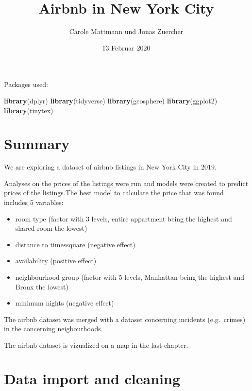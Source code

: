 \documentclass[]{article}
\title{Airbnb in New York City}
\author{Carole Mattmann und Jonas Zuercher}
\date{13 Februar 2020}
\newenvironment{Shaded}{\begin{snugshade}}{\end{snugshade}}
\newcommand{\KeywordTok}[1]{\textcolor[rgb]{0.13,0.29,0.53}{\textbf{#1}}}
\newcommand{\NormalTok}[1]{#1}
\providecommand{\tightlist}{%
  \setlength{\itemsep}{0pt}\setlength{\parskip}{0pt}}
\begin{document}
\maketitle

Packages used:

\begin{Shaded}
\begin{Highlighting}[]
\KeywordTok{library}\NormalTok{(dplyr)}
\KeywordTok{library}\NormalTok{(tidyverse)}
\KeywordTok{library}\NormalTok{(geosphere)}
\KeywordTok{library}\NormalTok{(ggplot2)}
\KeywordTok{library}\NormalTok{(tinytex)}
\end{Highlighting}
\end{Shaded}

\hypertarget{summary}{%
\section{Summary}\label{summary}}

We are exploring a dataset of airbnb listings in New York City in 2019.

Analyses on the prices of the listings were run and models were created
to predict prices of the listings.The best model to calculate the price
that was found includes 5 variables:

\begin{itemize}
\tightlist
\item
  room type (factor with 3 levels, entire appartment being the highest
  and shared room the lowest)
\item
  distance to timessquare (negative effect)
\item
  availability (positive effect)
\item
  neighbourhood group (factor with 5 levels, Manhattan being the highest
  and Bronx the lowest)
\item
  minimum nights (negative effect)
\end{itemize}

The airbnb dataset was merged with a dataset concerning incidents
(e.g.~crimes) in the concerning neigbourhoods.

The airbnb dataset is vizualized on a map in the last chapter.

\hypertarget{data-import-and-cleaning}{%
\section{Data import and cleaning}\label{data-import-and-cleaning}}
\end{document}
